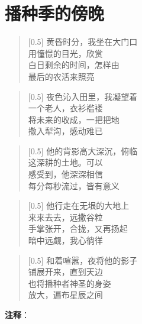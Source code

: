 \documentclass[12pt,UTF-8,openany]{ctexbook}
\begin{document}
\chapter{播种季的傍晚}

\begin{large}
    
    \begin{verse}[0.5\linewidth]
        黄昏时分，我坐在大门口 \\
        用憧憬的目光，欣赏 \\
        白日剩余的时间，怎样由 \\
        最后的农活来照亮
    \end{verse}
    
    
    \begin{verse}[0.5\linewidth]
        夜色沁入田里，我凝望着 \\
        一个老人，衣衫褴褛 \\
        将未来的收成，一把把地 \\
        撒入犁沟，感动难已
    \end{verse}
    
    
    \begin{verse}[0.5\linewidth]
        他的背影高大深沉，俯临 \\
        这深耕的土地。可以 \\
        感受到，他深深相信 \\
        每分每秒流过，皆有意义
    \end{verse}
    
    
    \begin{verse}[0.5\linewidth]
        他行走在无垠的大地上 \\
        来来去去，远撒谷粒 \\
        手掌张开，合拢，又再扬起 \\
        暗中远觑，我心徜徉
    \end{verse}
    
    
    \begin{verse}[0.5\linewidth]
        和着喧嚣，夜将他的影子 \\
        铺展开来，直到天边 \\
        也将播种者神圣的身姿 \\
        放大，遍布星辰之间
    \end{verse}
    
\end{large}


\newpage

\textbf{注释}：
\end{document}

